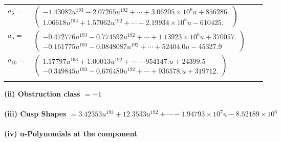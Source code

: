 \documentclass[1p]{elsarticle_modified}
\theoremstyle{definition}
\begin{document}
\begin{tabular}{m{7pt} m{180pt} m{7pt} m{180pt} }
\flushright $a_{6}=$&$\begin{pmatrix}-1.43082 u^{193}-2.07265 u^{192}+\cdots+3.06205\times10^{6} u+856286.\\1.06618 u^{193}+1.57062 u^{192}+\cdots-2.19934\times10^{6} u-610425.\end{pmatrix}$ \\
\flushright $a_{5}=$&$\begin{pmatrix}-0.472776 u^{193}-0.774592 u^{192}+\cdots+1.13923\times10^{6} u+370057.\\-0.161775 u^{193}-0.0848087 u^{192}+\cdots+52404.0 u-45327.9\end{pmatrix}$ \\
\flushright $a_{10}=$&$\begin{pmatrix}1.17797 u^{193}+1.00013 u^{192}+\cdots-954147. u+24399.5\\-0.349845 u^{193}-0.676480 u^{192}+\cdots+936578. u+319712.\end{pmatrix}$\\&\end{tabular}
\flushleft \textbf{(ii) Obstruction class $= -1$}\\~\\
\flushleft \textbf{(iii) Cusp Shapes $= 3.42353 u^{193}+12.3533 u^{192}+\cdots-1.94793\times10^{7} u-8.52189\times10^{6}$}\\~\\
\newpage\renewcommand{\arraystretch}{1}
\flushleft \textbf{(iv) u-Polynomials at the component}\newline \\
\end{document}

